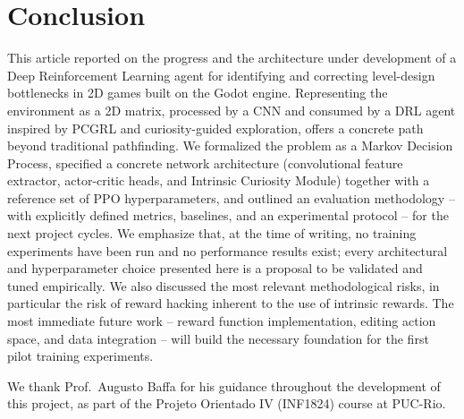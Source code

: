 \documentclass[sigconf,nonacm,language=english]{acmart}
\begin{document}
\section{Conclusion}
\label{sec:conclusao}

This article reported on the progress and the architecture under
development of a Deep Reinforcement Learning agent for identifying and
correcting level-design bottlenecks in 2D games built on the Godot engine.
Representing the environment as a 2D matrix, processed by a CNN and
consumed by a DRL agent inspired by PCGRL and curiosity-guided exploration,
offers a concrete path beyond traditional pathfinding. We formalized the
problem as a Markov Decision Process, specified a concrete network
architecture (convolutional feature extractor, actor-critic heads, and
Intrinsic Curiosity Module) together with a reference set of PPO
hyperparameters, and outlined an evaluation methodology -- with explicitly
defined metrics, baselines, and an experimental protocol -- for the next
project cycles. We emphasize that, at the time of writing, no training
experiments have been run and no performance results exist; every
architectural and hyperparameter choice presented here is a proposal to be
validated and tuned empirically. We also discussed the most relevant
methodological risks, in particular the risk of reward hacking inherent to
the use of intrinsic rewards. The most immediate future work -- reward
function implementation, editing action space, and data integration --
will build the necessary foundation for the first pilot training
experiments.

\begin{acks}
We thank Prof.\ Augusto Baffa for his guidance throughout the development
of this project, as part of the Projeto Orientado IV (INF1824) course at
PUC-Rio.
\end{acks}

\label{fim-conteudo}


\end{document}
